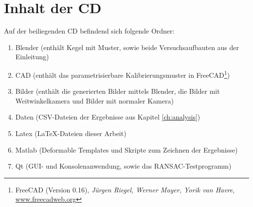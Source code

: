 \chapter{Inhalt der CD}
\label{ch:cdContent}

Auf der beiliegenden CD befindend sich folgende Ordner:
\begin{enumerate}
	\item Blender (enthält Kegel mit Muster, sowie beide Versuchsaufbauten aus der Einleitung)
	\item CAD (enthält das parametrisierbare Kalibrierungsmuster in FreeCAD\footnote{FreeCAD (Version 0.16), \textit{Jürgen Riegel, Werner Mayer, Yorik van Havre}, \url{www.freecadweb.org}})
	\item Bilder (enthält die generierten Bilder mittels Blender, die Bilder mit Weitwinkelkamera und Bilder mit normaler Kamera)
	\item Daten (CSV-Dateien der Ergebnisse aus Kapitel \ref{ch:analysis})
	\item Latex (\LaTeX-Dateien dieser Arbeit)
	\item Matlab (Deformable Templates und Skripte zum Zeichnen der Ergebnisse)
	\item Qt (GUI- und Konsolenanwendung, sowie das RANSAC-Testprogramm)

\end{enumerate}

